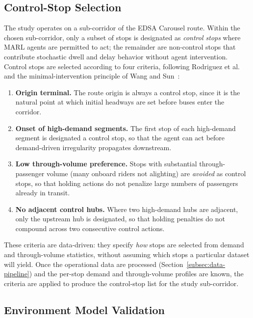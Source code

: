 \subsection{Control-Stop Selection}

The study operates on a sub-corridor of the EDSA Carousel route. Within the chosen sub-corridor, only a subset of stops is designated as \textit{control stops} where MARL agents are permitted to act; the remainder are non-control stops that contribute stochastic dwell and delay behavior without agent intervention. Control stops are selected according to four criteria, following Rodriguez et al.~\cite{Rodriguez2023Cooperative} and the minimal-intervention principle of Wang and Sun~\cite{Wangsun}:

\begin{enumerate}
    \item \textbf{Origin terminal.} The route origin is always a control stop, since it is the natural point at which initial headways are set before buses enter the corridor.
    \item \textbf{Onset of high-demand segments.} The first stop of each high-demand segment is designated a control stop, so that the agent can act before demand-driven irregularity propagates downstream.
    \item \textbf{Low through-volume preference.} Stops with substantial through-passenger volume (many onboard riders not alighting) are \textit{avoided} as control stops, so that holding actions do not penalize large numbers of passengers already in transit.
    \item \textbf{No adjacent control hubs.} Where two high-demand hubs are adjacent, only the upstream hub is designated, so that holding penalties do not compound across two consecutive control actions.
\end{enumerate}

These criteria are data-driven: they specify \textit{how} stops are selected from demand and through-volume statistics, without assuming which stops a particular dataset will yield. Once the operational data are processed (Section~\ref{subsec:data-pipeline}) and the per-stop demand and through-volume profiles are known, the criteria are applied to produce the control-stop list for the study sub-corridor.

\subsection{Environment Model Validation}

